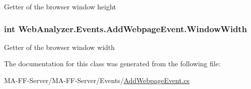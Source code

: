 Getter of the browser window height 

\hypertarget{class_web_analyzer_1_1_events_1_1_add_webpage_event_a3674f3dd2d4bcb2e5ff10af97b4f8bbb}{}
\subsubsection[{Window\+Width}]{\setlength{\rightskip}{0pt plus 5cm}int Web\+Analyzer.\+Events.\+Add\+Webpage\+Event.\+Window\+Width\hspace{0.3cm}{\ttfamily [get]}}\label{class_web_analyzer_1_1_events_1_1_add_webpage_event_a3674f3dd2d4bcb2e5ff10af97b4f8bbb}


Getter of the browser window width 



The documentation for this class was generated from the following file\+:\begin{DoxyCompactItemize}
\item 
M\+A-\/\+F\+F-\/\+Server/\+M\+A-\/\+F\+F-\/\+Server/\+Events/\hyperlink{_add_webpage_event_8cs}{Add\+Webpage\+Event.\+cs}\end{DoxyCompactItemize}
